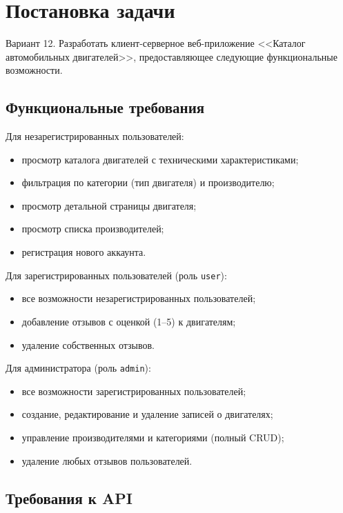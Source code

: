\documentclass[14pt,a4paper]{extarticle}
\begin{document}
\section{Постановка задачи}

Вариант 12. Разработать клиент-серверное веб-приложение <<Каталог автомобильных двигателей>>, предоставляющее следующие функциональные возможности.

\subsection{Функциональные требования}

Для незарегистрированных пользователей:
\begin{itemize}
  \item просмотр каталога двигателей с техническими характеристиками;
  \item фильтрация по категории (тип двигателя) и производителю;
  \item просмотр детальной страницы двигателя;
  \item просмотр списка производителей;
  \item регистрация нового аккаунта.
\end{itemize}

Для зарегистрированных пользователей (роль \texttt{user}):
\begin{itemize}
  \item все возможности незарегистрированных пользователей;
  \item добавление отзывов с оценкой (1--5) к двигателям;
  \item удаление собственных отзывов.
\end{itemize}

Для администратора (роль \texttt{admin}):
\begin{itemize}
  \item все возможности зарегистрированных пользователей;
  \item создание, редактирование и удаление записей о двигателях;
  \item управление производителями и категориями (полный CRUD);
  \item удаление любых отзывов пользователей.
\end{itemize}

\subsection{Требования к API}
\end{document}
